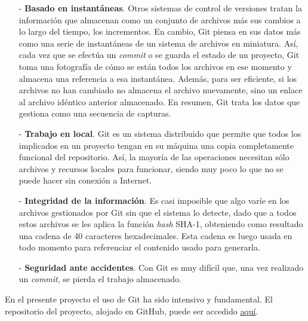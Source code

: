 \documentclass[a4paper]{article}
\begin{document}
	\begin{itemize}
		\item[-] \textbf{Basado en instantáneas}. Otros sistemas de control de versiones tratan la información que almacenan como un conjunto de archivos más sus cambios a lo largo del tiempo, los incrementos. En cambio, Git piensa en sus datos más como una serie de instantáneas de un sistema de archivos en miniatura. Así, cada vez que se efectúa un \emph{commit} o se guarda el estado de un proyecto, Git toma una fotografía de cómo se están todos los archivos en ese momento y almacena una referencia a esa instantánea. Además, para ser eficiente, si los archivos no han cambiado no almacena el archivo nuevamente, sino un enlace al archivo idéntico anterior almacenado. En resumen, Git trata los datos que gestiona como una secuencia de capturas.
		\item[-] \textbf{Trabajo en local}. Git es un sistema distribuido que permite que todos los implicados en un proyecto tengan en su máquina una copia completamente funcional del repositorio. Así, la mayoría de las operaciones necesitan sólo archivos y recursos locales para funcionar, siendo muy poco lo que no se puede hacer sin conexión a Internet. 
		\item[-] \textbf{Integridad de la información}. Es casi imposible que algo varíe en los archivos gestionados por Git sin que el sistema lo detecte, dado que a todos estos archivos se les aplica la función \emph{hash} SHA-1, obteniendo como resultado una cadena de 40 caracteres hexadecimales. Esta cadena es luego usada en todo momento para referenciar el contenido usado para generarla.
		\item[-] \textbf{Seguridad ante accidentes}. Con Git es muy difícil que, una vez realizado un \emph{commit}, se pierda el trabajo almacenado.
	\end{itemize}
	
	En el presente proyecto el uso de Git ha sido intensivo y fundamental. El repositorio del proyecto, alojado en GitHub, puede ser accedido \href{https://github.com/misrraimsp/firstmarket}{aquí}.
\end{document}
